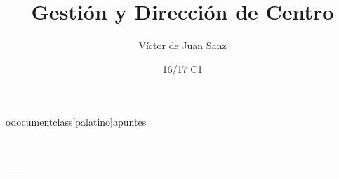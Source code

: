 odocumentclass[palatino]{apuntes}

\title{Gestión y Dirección de Centro}
\author{Víctor de Juan Sanz}
\date{16/17 C1}




\pagestyle{plain}
\maketitle

\tableofcontents
\newpage

\appendix

\chapter{---}


\printindex


